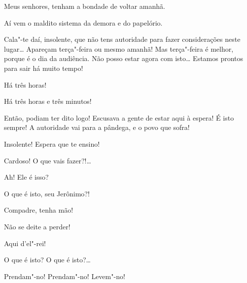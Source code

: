  Meus senhores, tenham a bondade de voltar amanhã.

 Aí vem o maldito sistema da demora e do papelório.

 Cala"-te daí, insolente, que não tens autoridade para fazer
considerações neste lugar\ldots{} Apareçam
terça"-feira ou mesmo amanhã! Mas terça"-feira é melhor, porque é o dia da
audiência. Não posso estar agora
com isto\ldots{} Estamos prontos para sair há muito tempo!

 Há três horas!

  Há três horas e três
minutos!

  Então, podiam ter dito logo!
Escusava a gente de estar aqui à espera! É isto
sempre! A autoridade vai para a pândega, e o povo que sofra!

 Insolente! Espera que te ensino! 

 Cardoso! O que vais fazer?!\ldots{}

 Ah! Ele é isso? 

 O que é isto, seu Jerônimo?!

 Compadre, tenha mão!

 Não se deite a perder!

  Aqui d’el"-rei!




 O que é isto? O que é isto?\ldots{} 

 Prendam"-no! Prendam"-no! 
Levem"-no!  




